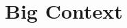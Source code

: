 \documentclass[12pt,a4paper]{report}
\newenvironment{todo}
{ ~\\[0.5em]
  {\color{red}\textbf{TODO}}
  \begin{easylist}[itemize]}
{ \end{easylist}
  ~}
\begin{document}
%  






\section{Big Context}
\end{document}
